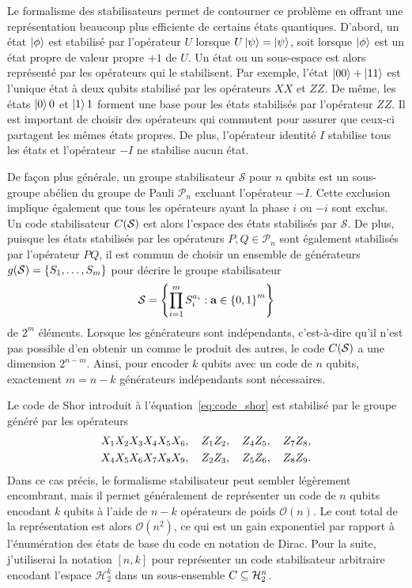 Le formalisme des stabilisateurs permet de contourner ce problème en offrant une 
représentation beaucoup plus efficiente de certains états quantiques.
D'abord,
un état $\ket\phi$ est stabilisé par l'opérateur $U$ lorsque $U\ket\psi = \ket\psi$,
soit lorsque $\ket \phi$ est un état propre de valeur propre $+1$ de $U$.
Un état ou un sous-espace est alors représenté par les opérateurs qui le stabilisent.
Par exemple,
l'état $\ket{00} + \ket{11}$ est l'unique état à deux qubits stabilisé par 
les opérateurs $XX$ et $ZZ$. 
De même,
les états $\ket 00$ et $\ket 11$ forment une base
pour les états stabilisés par l'opérateur $ZZ$.
Il est important de choisir des opérateurs qui commutent pour assurer 
que ceux-ci partagent les mêmes états propres.
De plus, l'opérateur identité $I$ stabilise tous les états
et l'opérateur $-I$ ne stabilise aucun état.

De façon plus générale,
un groupe stabilisateur $\mathcal S$ pour $n$ qubits est un sous-groupe abélien 
du groupe de Pauli $\mathcal P_n$ excluant l'opérateur $-I$.
Cette exclusion implique également que tous les opérateurs ayant la phase $i$ ou $-i$ sont exclus.
Un code stabilisateur $C(\mathcal S)$ est alors l'espace des états stabilisés par $\mathcal S$.
De plus,
puisque les états stabilisés par les opérateurs $P, Q \in \mathcal P_n$ sont également
stabilisés par l'opérateur $PQ$,
il est commun de choisir un ensemble de générateurs $g(\mathcal S) = \qty{S_1, \ldots, S_m}$
pour décrire le groupe stabilisateur
\begin{align}
  \mathcal S = 
  \qty{
    \prod_{i=1}^m S_i^{a_i} : \vb a \in \qty{0, 1}^m
  }
\end{align}
de $2^m$ éléments.
Lorsque les générateurs sont indépendants,
c'est-à-dire qu'il n'est pas possible d'en obtenir un comme le produit des autres,
le code $C(\mathcal S)$ a une dimension $2^{n - m}$.
Ainsi, 
pour encoder $k$ qubits avec un code de $n$ qubits,
exactement $m = n - k$ générateurs indépendants sont nécessaires.

Le code de Shor introduit à l'équation~\eqref{eq:code_shor} est stabilisé
par le groupe généré par les opérateurs 
\begin{gather}
    X_1 X_2 X_3 X_4 X_5 X_6, \quad
    Z_1 Z_2, \quad Z_4 Z_5, \quad Z_7 Z_8, \notag \\
    X_4 X_5 X_6 X_7 X_8 X_9, \quad
    Z_2 Z_3, \quad Z_5 Z_6, \quad Z_8 Z_9.
\end{gather}
Dans ce cas précis,
le formalisme stabilisateur peut sembler légèrement encombrant,
mais il permet généralement de représenter un code de $n$ qubits encodant $k$ qubits
à l'aide de $n - k$ opérateurs de poids $\mathcal O(n)$.
Le cout total de la représentation est alors $\mathcal O(n^2)$, ce qui est un gain exponentiel
par rapport à l'énumération des états de base du code en notation de Dirac.
Pour la suite,
j'utiliserai la notation $[n, k]$ pour représenter un code stabilisateur arbitraire 
encodant l'espace $\mathcal H_2^k$ dans un sous-ensemble $C \subseteq \mathcal H_2^n$.

